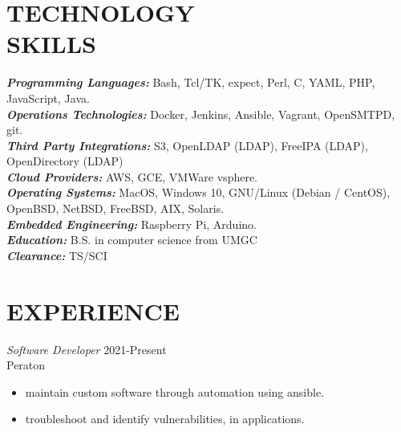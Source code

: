 \documentclass[margin, 10pt]{res} %
\begin{document}
\begin{resume}


\section{TECHNOLOGY \\ SKILLS}

{\sl \textbf{Programming Languages:}} Bash, Tcl/TK, expect, Perl, C, YAML, PHP, JavaScript, Java. \\
{\sl \textbf{Operations Technologies:}} Docker, Jenkins, Ansible, Vagrant, OpenSMTPD, git. \\
{\sl \textbf{Third Party Integrations:}} S3, OpenLDAP (LDAP), FreeIPA (LDAP), OpenDirectory (LDAP) \\
{\sl \textbf{Cloud Providers:}} AWS, GCE, VMWare vsphere. \\
{\sl \textbf{Operating Systems:}} MacOS, Windows 10, GNU/Linux (Debian / CentOS), OpenBSD, NetBSD, FreeBSD, AIX, Solaris. \\
{\sl \textbf{Embedded Engineering:}} Raspberry Pi, Arduino. \\
{\sl \textbf{Education:}} B.S. in computer science from UMGC\\
{\sl \textbf{Clearance:}} TS/SCI \\


\section{EXPERIENCE}
{\sl Software Developer } \hfill 2021-Present \\
Peraton
\begin{itemize}
  \item maintain custom software through automation using ansible.
  \item troubleshoot and identify vulnerabilities, in applications.
\end{itemize}


\end{resume}
\end{document}
